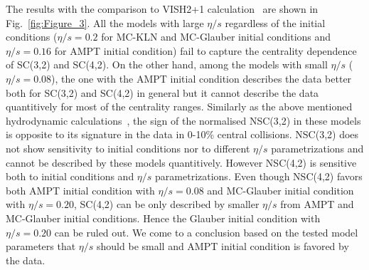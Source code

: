 The results with the comparison to VISH2+1 calculation~\cite{Zhu:2016puf} are shown in Fig.~\ref{fig:Figure_3}.  All the models with large $\eta/s$ regardless of the initial conditions ($\eta/s=0.2$ for MC-KLN and MC-Glauber initial conditions and $\eta/s=0.16$ for AMPT initial condition) fail to capture the centrality dependence of SC(3,2) and SC(4,2). 
On the other hand, among the models with small $\eta/s$ ($\eta/s=0.08$), the one with the AMPT initial condition describes the data better both for SC(3,2) and SC(4,2) in general but it cannot describe the data quantitively for most of the centrality ranges.
Similarly as the above mentioned hydrodynamic calculations~\cite{Niemi:2015qia}, the sign of the normalised NSC(3,2) in these models is opposite to its signature in the data in 0-10\% central collisions. NSC(3,2) does not show sensitivity to initial conditions nor to different $\eta/s$ parametrizations and cannot be described by these models quantitively.
However NSC(4,2) is sensitive both to initial conditions and $\eta/s$ parametrizations.
Even though NSC(4,2) favors both AMPT initial condition with $\eta/s=0.08$ and MC-Glauber initial condition with $\eta/s=0.20$,
SC(4,2) can be only described by smaller $\eta/s$ from AMPT and MC-Glauber initial conditions. Hence the Glauber initial condition with $\eta/s=0.20$ can be ruled out. We come to a conclusion based on the tested model parameters that $\eta/s$ should be small and AMPT initial condition is favored by the data.

